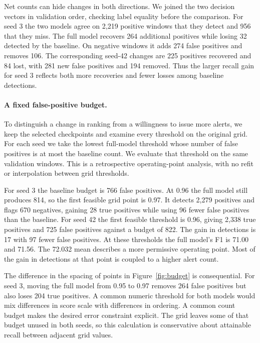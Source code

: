 \documentclass{article}
\begin{document}
Net counts can hide changes in both directions. We joined the two decision vectors in validation order, checking label equality before the comparison. For seed 3 the two models agree on 2,219 positive windows that they detect and 956 that they miss. The full model recovers 264 additional positives while losing 32 detected by the baseline. On negative windows it adds 274 false positives and removes 106. The corresponding seed-42 changes are 225 positives recovered and 84 lost, with 281 new false positives and 194 removed. Thus the larger recall gain for seed 3 reflects both more recoveries and fewer losses among baseline detections.

\paragraph{A fixed false-positive budget.}
To distinguish a change in ranking from a willingness to issue more alerts, we keep the selected checkpoints and examine every threshold on the original grid. For each seed we take the lowest full-model threshold whose number of false positives is at most the baseline count. We evaluate that threshold on the same validation windows. This is a retrospective operating-point analysis, with no refit or interpolation between grid thresholds.

For seed 3 the baseline budget is 766 false positives. At 0.96 the full model still produces 814, so the first feasible grid point is 0.97. It detects 2,279 positives and flags 670 negatives, gaining 28 true positives while using 96 fewer false positives than the baseline. For seed 42 the first feasible threshold is 0.96, giving 2,338 true positives and 725 false positives against a budget of 822. The gain in detections is 17 with 97 fewer false positives. At these thresholds the full model's F1 is 71.00 and 71.56. The 72.032 mean describes a more permissive operating point. Most of the gain in detections at that point is coupled to a higher alert count.



The difference in the spacing of points in Figure~\ref{fig:budget} is consequential. For seed 3, moving the full model from 0.95 to 0.97 removes 264 false positives but also loses 204 true positives. A common numeric threshold for both models would mix differences in score scale with differences in ordering. A common count budget makes the desired error constraint explicit. The grid leaves some of that budget unused in both seeds, so this calculation is conservative about attainable recall between adjacent grid values.
\end{document}

